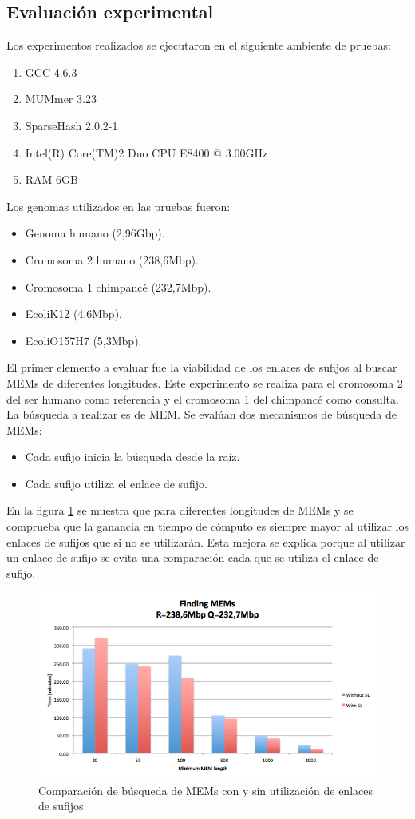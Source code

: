\documentclass[12pt,a4paper]{article}
\begin{document}
\subsection{Evaluación experimental}
\indent
Los experimentos realizados se ejecutaron en el siguiente ambiente de pruebas:
\begin{enumerate}
\item GCC 4.6.3
\item MUMmer 3.23
\item SparseHash 2.0.2-1
\item Intel(R) Core(TM)2 Duo CPU     E8400  @ 3.00GHz
\item RAM 6GB
\end{enumerate}
\indent
Los genomas utilizados en las pruebas fueron:
\begin{itemize}
\item Genoma humano (2,96Gbp).
\item Cromosoma 2 humano (238,6Mbp).
\item Cromosoma 1 chimpancé (232,7Mbp).
\item EcoliK12 (4,6Mbp).
\item EcoliO157H7 (5,3Mbp).
\end{itemize}
\indent
El primer elemento a evaluar fue la viabilidad de los enlaces de sufijos al buscar MEMs de diferentes longitudes. Este experimento se realiza para el cromosoma 2 del ser humano como referencia y el cromosoma 1 del chimpancé como consulta. La búsqueda a realizar es de MEM. Se evalúan dos mecanismos de búsqueda de MEMs:
\begin{itemize}
\item Cada sufijo inicia la búsqueda desde la raíz.
\item Cada sufijo utiliza el enlace de sufijo.
\end{itemize}
\indent
En la figura \ref{fig:sl-nosl} se muestra que para diferentes longitudes de MEMs y se comprueba que la ganancia en tiempo de cómputo es siempre mayor al utilizar los enlaces de sufijos que si no se utilizarán. Esta mejora se explica porque al utilizar un enlace de sufijo se evita una comparación cada que se utiliza el enlace de sufijo.\\
\begin{figure}[h]
\begin{center}
\includegraphics[scale=0.4]{sl-nosl.png}
\caption{Comparación de búsqueda de MEMs con y sin utilización de enlaces de sufijos.}
\label{fig:sl-nosl}
\end{center}
\end{figure}
\end{document}
